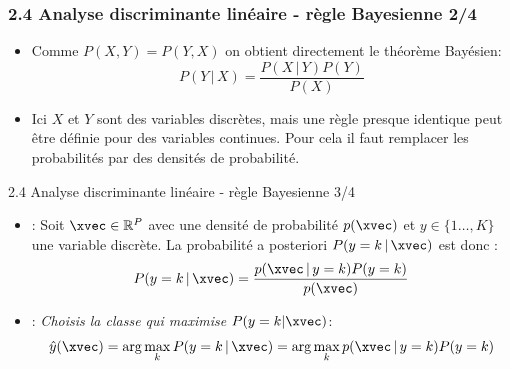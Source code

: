 \begin{frame}
\frametitle{2.4 Analyse discriminante linéaire - règle Bayesienne 2/4}
\begin{itemize}
\item Comme $P(X,Y)=P(Y,X)$ on obtient directement le théorème Bayésien:
\begin{equation}
  P(Y \, | \, X) = \frac{P(X \, | \, Y)P(Y)}{P(X)}
\end{equation}
\item Ici $X$ et $Y$ sont des variables discrètes, mais une règle presque identique peut être définie pour des variables continues. Pour cela il faut remplacer les probabilités par des densités de probabilité. 
\end{itemize}


\end{frame}

\begin{frame}{2.4 Analyse discriminante linéaire - règle Bayesienne 3/4}

\begin{itemize}
  \item {}: Soit $\xvec \in \mathbb{R}^P$ avec une densité de probabilité $p(\xvec)$ et $y \in \{1 \ldots, K\}$ une variable discrète. La probabilité a posteriori $P(y=k\,|\,\xvec)$ est donc :
  \begin{equation}
    P(y=k \, | \, \xvec) = \frac{p(\xvec \, | \, y=k) P(y=k)}{p(\xvec)}
  \end{equation}
  \item {}: \emph{Choisis la classe qui maximise} $P(y=k|\xvec)$:
  \begin{equation}
    \hat{y}(\xvec) = \arg\max_k P(y=k \, | \, \xvec) = \arg\max_k p(\xvec\,|\,y=k)P(y=k)
  \end{equation}
\end{itemize}
\end{frame}


